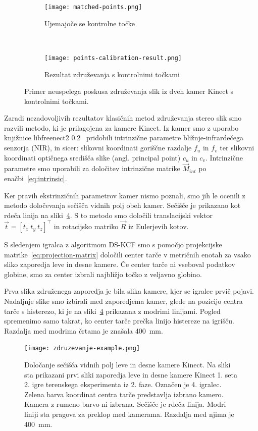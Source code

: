 \begin{figure}[!htb]
	\centering
	\begin{subfigure}[t]{0.45\columnwidth}
		\texttt{[image: matched-points.png]}
		\caption{Ujemajoče se kontrolne točke}
		\label{fig:zdruzevanje-ujemajoce-cp}
	\end{subfigure}
	~
	\begin{subfigure}[t]{0.45\columnwidth}
		\texttt{[image: points-calibration-result.png]}
		\caption{Rezultat združevanja s kontrolnimi točkami}
		\label{fig:zdruzevanje-result-cp}
	\end{subfigure}
	\caption[Neuspelo združevanje slik s kontrolnimi točkami]{Primer neuspelega poskusa združevanja slik iz dveh kamer Kinect s kontrolnimi točkami.}
	\label{fig:zdruzevanje-cp}
\end{figure}

Zaradi nezadovoljivih rezultatov klasičnih metod združevanja stereo slik smo razvili metodo, ki je prilagojena za kamere Kinect. Iz kamer smo z uporabo knjižnice libfreenect2 0.2~\cite{lingzhu2016libfreenect2} pridobili intrinzične parametre bližnje-infrardečega senzorja (NIR), in sicer: slikovni koordinati goriščne razdalje $f_u$ in $f_v$ ter slikovni koordinati optičnega središča slike (angl. principal point) $c_u$ in $c_v$. Intrinzične parametre smo uporabili za določitev intrinzične matrike $\vec{M}_{int}$ po enačbi~\eqref{eq:intrinsic}.

Ker pravih ekstrinzičnih parametrov kamer nismo poznali, smo jih le ocenili z metodo določevanja sečišča vidnih polj obeh kamer. Sečišče je prikazano kot rdeča linija na sliki~\ref{fig:zdruzevanje}. S to metodo smo določili translacijski vektor $\vec{t} = \left [ t_x~ t_y~ t_z \right]^\top$ in rotacijsko matriko $\vec{R}$ iz Eulerjevih kotov.

S sledenjem igralca z algoritmom DS-KCF smo s pomočjo projekcijske matrike~\eqref{eq:projection-matrix} določili center tarče v metričnih enotah za vsako sliko zaporedja leve in desne kamere. Če center tarče ni vseboval podatkov globine, smo za center izbrali najbližjo točko z veljavno globino.

Prva slika združenega zaporedja je bila slika kamere, kjer se igralec prvič pojavi. Nadaljnje slike smo izbirali med zaporedjema kamer, glede na pozicijo centra tarče s histerezo, ki je na sliki~\ref{fig:zdruzevanje} prikazana z modrimi linijami. Pogled spremenimo samo takrat, ko center tarče prečka linijo histereze na igrišču. Razdalja med modrima črtama je znašala \SI{400}{mm}.


\begin{figure}[!htb]
	\centering
	\texttt{[image: zdruzevanje-example.png]}
	\caption[Določanje sečišča vidnih polj leve in desne kamere Kinect]{Določanje sečišča vidnih polj leve in desne kamere Kinect. Na sliki sta prikazani prvi sliki zaporedja leve in desne kamere Kinect 1. seta 2. igre terenskega eksperimenta iz 2. faze. Označen je 4. igralec. Zelena barva koordinat centra tarče predstavlja izbrano kamero. Kamera z rumeno barvo ni izbrana. Sečišče je rdeča linija. Modri liniji sta pragova za preklop med kamerama. Razdalja med njima je \SI{400}{mm}.}
	\label{fig:zdruzevanje}
\end{figure}

